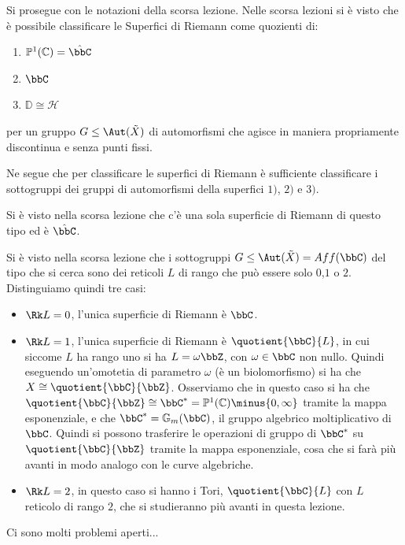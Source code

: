 
Si prosegue con le notazioni della scorsa lezione.
Nelle scorsa lezioni si è visto che è possibile classificare le Superfici di Riemann come quozienti di:
\begin{enumerate}
\item $\mathbb{P}^1(\mathbb{C})=\hat{\bbC}$
\item $\bbC$
\item $\mathbb{D} \cong \mathcal{H}$
\end{enumerate}
per un gruppo $G\le\Aut(\tilde{X})$ di automorfismi che agisce in maniera propriamente discontinua e senza punti fissi.

Ne segue che per classificare le superfici di Riemann è sufficiente classificare i sottogruppi dei gruppi di automorfismi della superfici $1)$, $2)$ e $3)$.

 Si è visto nella scorsa lezione che c'è una sola superficie di Riemann di questo tipo ed è $\hat{\bbC}$.

 Si è visto nella scorsa lezione che i sottogruppi $G\le\Aut(\tilde{X})=Aff(\bbC)$ del tipo che si cerca sono dei reticoli $L$ di rango che può essere solo $0$,$1$ o $2$. Distinguiamo quindi tre casi:
\begin{itemize}
\item $\Rk L=0$, l'unica superficie di Riemann è $\bbC$.
\item $\Rk L=1$, l'unica superficie di Riemann è $\quotient{\bbC}{L}$, in cui siccome $L$ ha rango uno si ha $L=\omega \bbZ$, con $\omega\in\bbC$ non nullo. Quindi eseguendo un'omotetia di parametro $\omega$ (è un biolomorfismo) si ha che $X\cong \quotient{\bbC}{\bbZ}$.
Osserviamo che in questo caso si ha che $\quotient{\bbC}{\bbZ}\cong \bbC^{*}=\mathbb{P}^1(\mathbb{C})\minus\{0,\infty\}$ tramite la mappa esponenziale, e che $\bbC^{*}=\mathbb{G}_m(\bbC)$, il gruppo algebrico moltiplicativo di $\bbC$. Quindi si possono trasferire le operazioni di gruppo di $\bbC^{*}$ su $\quotient{\bbC}{\bbZ}$ tramite la mappa esponenziale, cosa che si farà più avanti in modo analogo con le curve algebriche.
\item $\Rk L=2$, in questo caso si hanno i Tori, $\quotient{\bbC}{L}$ con $L$ reticolo di rango $2$, che si studieranno più avanti in questa lezione.
\end{itemize}
 Ci sono molti problemi aperti...

